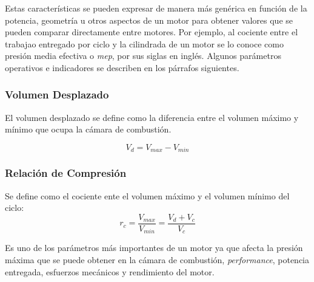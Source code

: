Estas características se pueden expresar de manera más genérica en función de la
potencia, geometría u otros aspectos de un motor para obtener valores que se
pueden comparar directamente entre motores.
%
Por ejemplo, al cociente entre el trabajao entregado por ciclo y la cilindrada
de un motor se lo conoce como presión media efectiva o \emph{mep}, por sus
siglas en inglés.
%
Algunos parámetros operativos e indicadores se describen en los párrafos
siguientes.


\subsubsection{Volumen Desplazado}
%
El volumen desplazado se define como la diferencia entre el volumen máximo y
mínimo que ocupa la cámara de combustión.

\begin{equation}\label{eq:vol_desp} V_d = V_{max}-V_{min}
\end{equation}
%



\subsubsection{Relación de Compresión}

Se define como el cociente ente el volumen máximo y el volumen mínimo del ciclo:
%
\begin{equation}\label{eq:rel_comp}
  r_c = \frac{V_{max}}{V_{min}} = \frac{V_d+V_c}{V_c}
\end{equation}

%
Es uno de los parámetros más importantes de un motor ya que afecta la presión
máxima que se puede obtener en la cámara de combustión, \emph{performance},
potencia entregada, esfuerzos mecánicos y rendimiento del motor.

